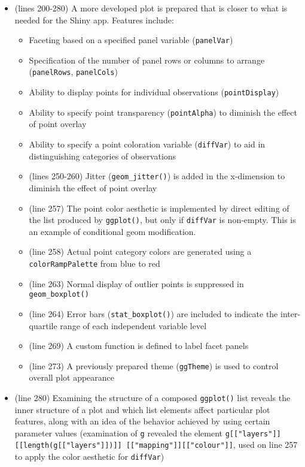 \documentclass[10pt, letterpaper]{article}
\begin{document}
\begin{spacing}{1.0}
\begin{itemize}
    \item (lines 200-280) A more developed plot is prepared that is closer to what is needed for the Shiny app.  Features include:
    \begin{itemize}
        \item Faceting based on a specified panel variable (\texttt{panelVar})
        \item Specification of the number of panel rows or columns to arrange (\texttt{panelRows}, \texttt{panelCols})
        \item Ability to display points for individual observations (\texttt{pointDisplay})
        \item Ability to specify point transparency (\texttt{pointAlpha}) to diminish the effect of point overlay
        \item Ability to specify a point coloration variable (\texttt{diffVar}) to aid in distinguishing categories of observations 
        \item (lines 250-260) Jitter (\texttt{geom\_jitter()}) is added in the x-dimension to diminish the effect of point overlay
        \item (line 257) The point color aesthetic is implemented by direct editing of the list produced by \texttt{ggplot()}, but only if \texttt{diffVar} is non-empty.  This is an example of conditional geom modification.
        \item (line 258) Actual point category colors are generated using a \texttt{colorRampPalette} from blue to red
        \item (line 263) Normal display of outlier points is suppressed in \texttt{geom\_boxplot()}
        \item (line 264) Error bars (\texttt{stat\_boxplot()}) are included to indicate the inter-quartile range of each independent variable level
        \item (line 269) A custom function is defined to label facet panels
        \item (line 273) A previously prepared theme (\texttt{ggTheme}) is used to control overall plot appearance
    \end{itemize}
    \item (line 280) Examining the structure of a composed \texttt{ggplot()} list reveals the inner structure of a plot and which list elements affect particular plot features, along with an idea of the behavior achieved by using certain parameter values (examination of \texttt{g} revealed the element \texttt{g[["layers"]][[length(g[["layers"]])]] [["mapping"]][["colour"]]}, used on line 257 to apply the color aesthetic for \texttt{diffVar})
\end{itemize}


\end{spacing}
\end{document}
